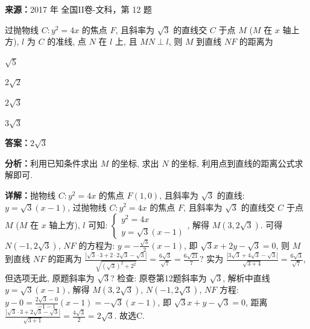\begin{question}[points=5]
\textbf{来源：}2017 年 全国II卷-文科，第 12 题\par
过抛物线 $C: y^2=4x$ 的焦点 $F$, 且斜率为 $\sqrt{3}$ 的直线交 $C$ 于点 $M$ ($M$ 在 $x$ 轴上方), $l$ 为 $C$ 的准线, 点 $N$ 在 $l$ 上, 且 $MN\perp l$, 则 $M$ 到直线 $NF$ 的距离为
\begin{choices}
  \item $\sqrt{5}$
  \item $2\sqrt{2}$
  \item $2\sqrt{3}$
  \item $3\sqrt{3}$
\end{choices}
\begin{solution}
\textbf{答案：}$2\sqrt{3}$

\textbf{分析：}利用已知条件求出 $M$ 的坐标, 求出 $N$ 的坐标, 利用点到直线的距离公式求解即可.

\textbf{详解：}抛物线 $C: y^2=4x$ 的焦点 $F(1,0)$, 且斜率为 $\sqrt{3}$ 的直线: $y=\sqrt{3}(x-1)$, 过抛物线 $C: y^2=4x$ 的焦点 $F$, 且斜率为 $\sqrt{3}$ 的直线交 $C$ 于点 $M$ ($M$ 在 $x$ 轴上方), $l$ 可知: $\begin{cases} y^2=4x\\ y=\sqrt{3}(x-1) \end{cases}$, 解得 $M(3,2\sqrt{3})$. 可得 $N(-1,2\sqrt{3})$, $NF$ 的方程为: $y=-\frac{\sqrt{3}}{2}(x-1)$, 即 $\sqrt{3}x+2y-\sqrt{3}=0$, 则 $M$ 到直线 $NF$ 的距离为 $\frac{|\sqrt{3}\cdot3+2\cdot2\sqrt{3}-\sqrt{3}|}{\sqrt{(\sqrt{3})^2+2^2}}=\frac{6\sqrt{3}}{\sqrt{7}}=\frac{6\sqrt{21}}{7}$? 实为 $\frac{|3\sqrt{3}+4\sqrt{3}-\sqrt{3}|}{\sqrt{3+4}}=\frac{6\sqrt{3}}{\sqrt{7}}$, 但选项无此, 原题斜率为 $\sqrt{3}$? 检查: 原卷第12题斜率为 $\sqrt{3}$, 解析中直线 $y=\sqrt{3}(x-1)$, 解得 $M(3,2\sqrt{3})$, $N(-1,2\sqrt{3})$, $NF$ 方程: $y-0=\frac{2\sqrt{3}-0}{-1-1}(x-1)=-\sqrt{3}(x-1)$, 即 $\sqrt{3}x+y-\sqrt{3}=0$, 距离 $\frac{|\sqrt{3}\cdot3+2\sqrt{3}-\sqrt{3}|}{\sqrt{3+1}}=\frac{4\sqrt{3}}{2}=2\sqrt{3}$. 故选C.
\end{solution}
\end{question}

